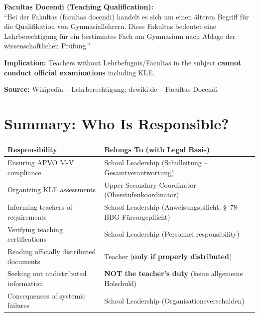 \documentclass[11pt,a4paper]{article}
\begin{document}
\begin{sourcebox}
\textbf{Facultas Docendi (Teaching Qualification):}\\
``Bei der Fakultas (facultas docendi) handelt es sich um einen älteren Begriff für die Qualifikation von Gymnasiallehrern. Diese Fakultas bedeutet eine Lehrberechtigung für ein bestimmtes Fach am Gymnasium nach Ablage der wissenschaftlichen Prüfung.''

\textbf{Implication:} Teachers without Lehrbefugnis/Facultas in the subject \textbf{cannot conduct official examinations} including KLE.

\textbf{Source:} Wikipedia -- Lehrberechtigung; dewiki.de -- Facultas Docendi
\end{sourcebox}

\section{Summary: Who Is Responsible?}

\begin{center}
\begin{tabular}{p{6cm}p{7.5cm}}
\toprule
\textbf{Responsibility} & \textbf{Belongs To (with Legal Basis)} \\
\midrule
Ensuring APVO M-V compliance & School Leadership (Schulleitung -- Gesamtverantwortung) \\
Organizing KLE assessments & Upper Secondary Coordinator (Oberstufenkoordinator) \\
Informing teachers of requirements & School Leadership (Anweisungspflicht, \S~78 BBG Fürsorgepflicht) \\
Verifying teaching certifications & School Leadership (Personnel responsibility) \\
Reading officially distributed documents & Teacher (\textbf{only if properly distributed}) \\
Seeking out undistributed information & \textbf{NOT the teacher's duty} (keine allgemeine Holschuld) \\
Consequences of systemic failures & School Leadership (Organisationsverschulden) \\
\bottomrule
\end{tabular}
\end{center}

\vspace{1em}
\end{document}
